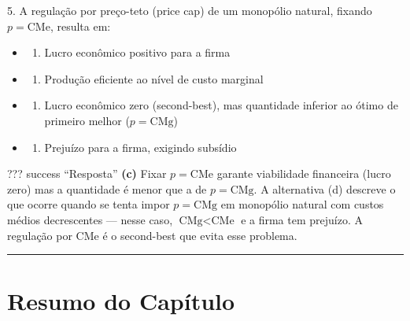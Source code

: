 \documentclass[11pt,twoside,openright]{book}
\providecommand{\tightlist}{\setlength{\itemsep}{0pt}\setlength{\parskip}{0pt}}
\begin{document}
\begin{infobox}{5. A regulação por preço-teto (price cap) de um monopólio natural, fixando $p = \text{CMe}$, resulta em:}

\begin{itemize}
\tightlist
\item
  \begin{enumerate}
  \def\labelenumi{(\alph{enumi})}
  \tightlist
  \item
    Lucro econômico positivo para a firma
  \end{enumerate}
\item
  \begin{enumerate}
  \def\labelenumi{(\alph{enumi})}
  \setcounter{enumi}{1}
  \tightlist
  \item
    Produção eficiente ao nível de custo marginal
  \end{enumerate}
\item
  \begin{enumerate}
  \def\labelenumi{(\alph{enumi})}
  \setcounter{enumi}{2}
  \tightlist
  \item
    Lucro econômico zero (second-best), mas quantidade inferior ao ótimo
    de primeiro melhor (\(p = \text{CMg}\))
  \end{enumerate}
\item
  \begin{enumerate}
  \def\labelenumi{(\alph{enumi})}
  \setcounter{enumi}{3}
  \tightlist
  \item
    Prejuízo para a firma, exigindo subsídio
  \end{enumerate}
\end{itemize}

??? success ``Resposta'' \textbf{(c)} Fixar \(p = \text{CMe}\) garante
viabilidade financeira (lucro zero) mas a quantidade é menor que a de
\(p = \text{CMg}\). A alternativa (d) descreve o que ocorre quando se
tenta impor \(p = \text{CMg}\) em monopólio natural com custos médios
decrescentes --- nesse caso, \(\text{CMg} < \text{CMe}\) e a firma tem
prejuízo. A regulação por CMe é o second-best que evita esse problema.

\end{infobox}

\begin{center}\rule{0.5\linewidth}{0.5pt}\end{center}

\section{Resumo do Capítulo}\label{resumo-do-capuxedtulo-1}
\end{document}

